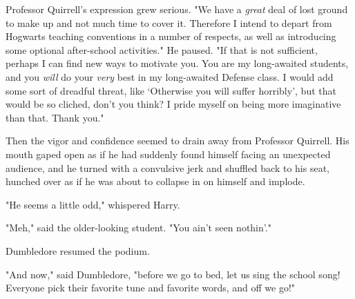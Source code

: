 Professor Quirrell's expression grew serious. "We have a \emph{great} deal of
lost ground to make up and not much time to cover it. Therefore I intend to
depart from Hogwarts teaching conventions in a number of respects, as well as
introducing some optional after-school activities." He paused. "If that is not
sufficient, perhaps I can find new ways to motivate you. You are my
long-awaited students, and you \emph{will} do your \emph{very} best in my
long-awaited Defense class. I would add some sort of dreadful threat, like
`Otherwise you will suffer horribly', but that would be so cliched, don't you
think? I pride myself on being more imaginative than that. Thank you."

Then the vigor and confidence seemed to drain away from Professor Quirrell.
His mouth gaped open as if he had suddenly found himself facing an unexpected
audience, and he turned with a convulsive jerk and shuffled back to his seat,
hunched over as if he was about to collapse in on himself and implode.

"He seems a little odd," whispered Harry.

"Meh," said the older-looking student. "You ain't seen nothin'."

Dumbledore resumed the podium.

"And now," said Dumbledore, "before we go to bed, let us sing the school song!
Everyone pick their favorite tune and favorite words, and off we go!"
